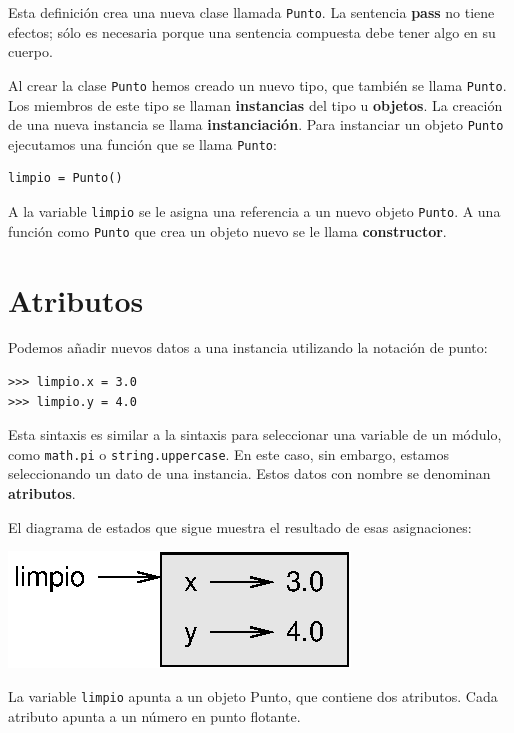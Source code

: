 Esta definición crea una nueva clase llamada \texttt{Punto}. La sentencia
\textbf{pass} no tiene efectos; sólo es necesaria porque una sentencia
compuesta debe tener algo en su cuerpo.

Al crear la clase \texttt{Punto} hemos creado un nuevo tipo, que también
se llama \texttt{Punto}. Los miembros de este tipo se llaman \textbf{instancias}
del tipo u \textbf{objetos}. La creación de una nueva instancia se
llama \textbf{instanciación}. Para instanciar un objeto \texttt{Punto}
ejecutamos una función que se llama \texttt{Punto}:

  
\begin{verbatim}
limpio = Punto()
\end{verbatim}

A la variable \texttt{limpio} se le asigna una referencia a un nuevo
objeto \texttt{Punto}. A una función como \texttt{Punto} que crea
un objeto nuevo se le llama \textbf{constructor}.

\section{Atributos}


Podemos añadir nuevos datos a una instancia utilizando la notación
de punto:
\begin{verbatim}
>>> limpio.x = 3.0
>>> limpio.y = 4.0
\end{verbatim}

Esta sintaxis es similar a la sintaxis para seleccionar una variable
de un módulo, como \texttt{math.pi} o \texttt{string.uppercase}. En
este caso, sin embargo, estamos seleccionando un dato de una instancia.
Estos datos con nombre se denominan \textbf{atributos}.

El diagrama de estados que sigue muestra el resultado de esas asignaciones:

\beforefig \centerline{\includegraphics{illustrations/point}}
\afterfig

La variable \texttt{limpio} apunta a un objeto Punto, que contiene
dos atributos. Cada atributo apunta a un número en punto flotante.

